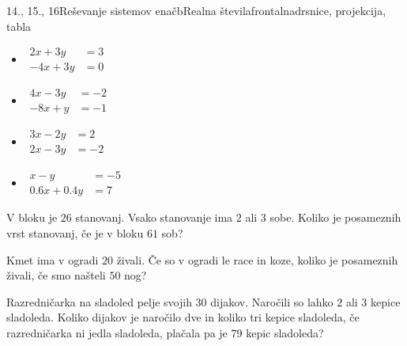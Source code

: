 \begin{priprava}{14., 15., 16}{}{Reševanje sistemov enačb}{Realna števila}{frontalna}{drsnice, projekcija, tabla}
\begin{naloga}
\begin{multicols}{2}
\begin{itemize}
                        \item $\begin{aligned}
                            2x+3y&=3 \\ -4x+3y&=0
                        \end{aligned}$ 
                        \item $\begin{aligned}
                            4x-3y&=-2 \\ -8x+y&=-1
                        \end{aligned}$ 
                        \item $\begin{aligned}
                            3x-2y&=2 \\ 2x-3y&=-2
                        \end{aligned}$ 
                        \item $\begin{aligned}
                            x-y&=-5 \\ 0.6x+0.4y&=7
                        \end{aligned}$ 
                    

                \end{itemize}
            \end{multicols}
            \end{naloga}
        


        
            \begin{naloga}
                V bloku je $26$ stanovanj. Vsako stanovanje ima $2$ ali $3$ sobe. Koliko je posameznih vrst stanovanj, če je v bloku $61$ sob?
                
            \end{naloga}

            \begin{naloga}
                Kmet ima v ogradi $20$  živali. Če so v ogradi le race in koze, koliko je posameznih živali, če smo našteli $50$ nog? 
                
            \end{naloga}

        


        
            \begin{naloga}
                Razredničarka na sladoled pelje svojih $30$ dijakov. Naročili so lahko $2$ ali $3$ kepice sladoleda. Koliko dijakov je naročilo dve in koliko tri kepice sladoleda,
                če razredničarka ni jedla sladoleda, plačala pa je $79$ kepic sladoleda?
                

\end{naloga}
\end{priprava}
